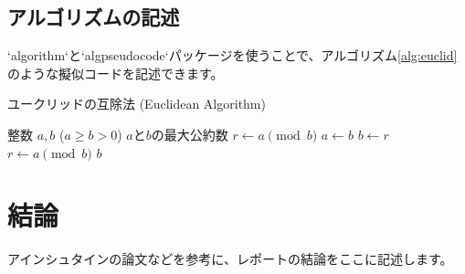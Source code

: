 \subsection{アルゴリズムの記述}
`algorithm`と`algpseudocode`パッケージを使うことで、アルゴリズム\ref{alg:euclid}のような擬似コードを記述できます。

\begin{algorithm}[htbp]
  \caption{ユークリッドの互除法 (Euclidean Algorithm)}
  \label{alg:euclid}
  \begin{algorithmic}[1] %
    \Require 整数 $a, b$ ($a \ge b > 0$)
    \Ensure $a$と$b$の最大公約数
    \State $r \gets a \pmod b$
      \State $a \gets b$
      \State $b \gets r$
      \State $r \gets a \pmod b$
    \EndWhile
    \State \Return $b$
  \end{algorithmic}
\end{algorithm}




\section{結論}
アインシュタインの論文\cite{einstein1905}などを参考に、レポートの結論をここに記述します。